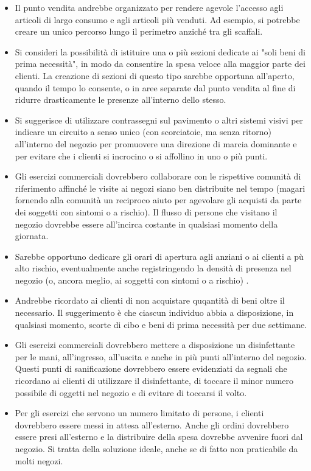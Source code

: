 \documentclass[onecolumn,journal]{IEEEtran}
\begin{document}
\begin{multicols}{2}
\begin{itemize}
  \item Il punto vendita andrebbe organizzato per rendere agevole l'accesso agli articoli di largo consumo e agli articoli più venduti. Ad esempio, si potrebbe creare un unico percorso lungo il perimetro anziché tra gli scaffali.
  \item Si consideri la possibilità di istituire una o più sezioni dedicate ai "soli beni di prima necessità", in modo da consentire la spesa veloce alla maggior parte dei clienti. La creazione di sezioni di questo tipo sarebbe opportuna all'aperto, quando il tempo lo consente, o in aree separate dal punto vendita al fine di ridurre drasticamente le presenze all'interno dello stesso.
  \item Si suggerisce di utilizzare contrassegni sul pavimento o altri sistemi visivi per indicare un circuito a senso unico (con scorciatoie, ma senza ritorno) all'interno del negozio per promuovere una direzione di marcia dominante e per evitare che i clienti si incrocino o si affollino in uno o più punti.
  \item Gli esercizi commerciali dovrebbero collaborare con le rispettive comunità di riferimento affinché le visite ai negozi siano ben distribuite nel tempo (magari fornendo alla comunità un reciproco aiuto per agevolare gli acquisti da parte dei soggetti con sintomi o a rischio). Il flusso di persone che visitano il negozio dovrebbe essere all'incirca costante in qualsiasi momento della giornata.
  \item Sarebbe opportuno dedicare gli orari di apertura agli anziani o ai clienti a pù alto rischio, eventualmente anche registringendo la densità di presenza nel negozio (o, ancora meglio, ai soggetti con sintomi o a rischio) .
  \item Andrebbe ricordato ai clienti di non acquistare quqantità di beni oltre il necessario. Il suggerimento è che ciascun individuo abbia a disposizione, in qualsiasi momento, scorte di cibo e beni di prima necessità per due settimane.
  \item Gli esercizi commerciali dovrebbero mettere a disposizione un disinfettante per le mani, all'ingresso, all'uscita e anche in più punti all'interno del negozio. Questi punti di sanificazione dovrebbero essere evidenziati da segnali che ricordano ai clienti di utilizzare il disinfettante, di toccare il minor numero possibile di oggetti nel negozio e di evitare di toccarsi il volto.
  \item Per gli esercizi che servono un numero limitato di persone, i clienti dovrebbero essere messi in attesa all'esterno. Anche gli ordini dovrebbero essere presi all'esterno e la distribuire della spesa dovrebbe avvenire fuori dal negozio. Si tratta della soluzione ideale, anche se di fatto non praticabile da molti negozi.

\end{itemize}
\end{multicols}
\end{document}
